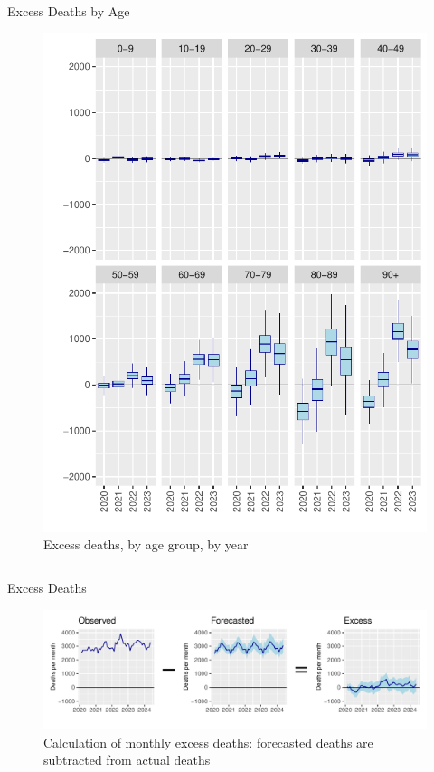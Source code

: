 \documentclass[final]{beamer}
\newlength{\onecolwid}
\newlength{\twocolwid}
\begin{document}
\begin{frame}[t]
\begin{columns}[t]
\begin{column}{\twocolwid}
\begin{columns}[t,totalwidth=\twocolwid]
\begin{column}{\onecolwid}
\begin{block}{Excess Deaths by Age}
\begin{figure}
\includegraphics[width = 0.9 \linewidth]{fig_excess_age}
\caption{Excess deaths, by age group, by year}
\end{figure}
\end{block}

\end{column} %

\end{columns} %



\begin{alertblock}{Excess Deaths}

\begin{figure}
\includegraphics[width = \linewidth]{fig_calc_excess}
\caption{Calculation of monthly excess deaths: forecasted deaths are subtracted from actual deaths}
\end{figure}


\end{alertblock}
\end{column}
\end{columns}
\end{frame}
\end{document}
